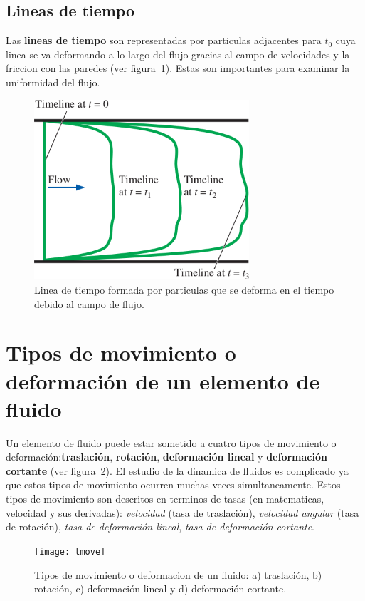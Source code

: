 \documentclass[10pt, oneside]{article}
\begin{document}
\subsection{Lineas de tiempo}
Las \textbf{lineas de tiempo} son representadas por particulas adjacentes para $t_0$  cuya linea se va deformando a lo largo del flujo gracias al campo de velocidades y la friccion con las paredes (ver figura~\ref{linet}). Estas son importantes para examinar la uniformidad del flujo. 
\begin{figure}[h]
\centering
\includegraphics[width=8cm]{linet}
\caption{Linea de tiempo formada por particulas que se deforma en el tiempo debido al campo de flujo.}
\label{linet}
\end{figure}

\section{Tipos de movimiento o deformaci\'on de un elemento de fluido}
Un elemento de fluido puede estar sometido a cuatro tipos de movimiento o deformaci\'on:\textbf{traslaci\'on}, \textbf{rotaci\'on}, \textbf{deformaci\'on lineal} y \textbf{deformaci\'on cortante} (ver figura~\ref{tmove}). El estudio de la dinamica de fluidos es complicado ya que estos tipos de movimiento ocurren muchas veces simultaneamente. Estos tipos de movimiento son descritos en terminos de tasas (en matematicas, velocidad y sus derivadas): \emph{velocidad} (tasa de traslaci\'on), \emph{velocidad angular} (tasa de rotaci\'on), \emph{tasa de deformaci\'on lineal}, \emph{tasa de deformaci\'on cortante}.

\begin{figure}[h]
\centering
\texttt{[image: tmove]}
\caption{Tipos de movimiento o deformacion de un fluido: a) traslaci\'on, b) rotaci\'on, c) deformaci\'on lineal y d) deformaci\'on cortante.}
\label{tmove}
\end{figure}
\end{document}
